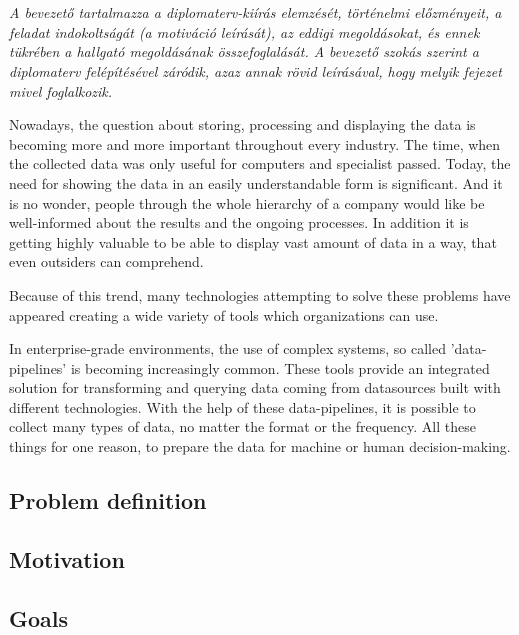\chapter{\bevezetes}

\textit{A bevezető tartalmazza a diplomaterv-kiírás elemzését, történelmi előzményeit, a feladat indokoltságát (a motiváció leírását), az eddigi megoldásokat, és ennek tükrében a hallgató megoldásának összefoglalását.
A bevezető szokás szerint a diplomaterv felépítésével záródik, azaz annak rövid leírásával, hogy melyik fejezet mivel foglalkozik.}


Nowadays, the question about storing, processing and displaying the data is becoming more and more important throughout every industry. The time, when the collected data was only useful for computers and specialist passed. Today, the need for showing the data in an easily understandable form is significant. And it is no wonder, people through the whole hierarchy of a company would like be well-informed about the results and the ongoing processes. In addition it is getting highly valuable to be able to display vast amount of data in a way, that even outsiders can comprehend.

Because of this trend, many technologies attempting to solve these problems have
appeared creating a wide variety of tools which organizations can use.

In enterprise-grade environments, the use of complex systems, so called 'data-pipelines' is becoming increasingly common. These tools provide an integrated solution for transforming and querying data coming from datasources built with different technologies. With the help of these data-pipelines, it is possible to collect many types of data, no matter the format or the frequency. All these things for one reason, to prepare the data for machine or human decision-making.

\section{Problem definition}

\section{Motivation}

\section{Goals}
